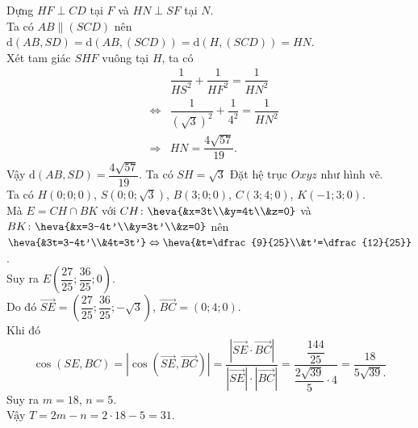 \begin{ex}
{\begin{itemchoice}
			\itemch
			Dựng $HF\perp CD$ tại $F$ và $HN\perp SF$ tại $N$.\\
			Ta có $AB\parallel (SCD)$ nên $\mathrm{d}(AB,SD)=\mathrm{d}\left(AB,\left(SCD\right)\right)=\mathrm{d}\left(H,\left(SCD\right)\right)=HN$.\\
			Xét tam giác $SHF$ vuông tại $H$, ta có 
			\begin{eqnarray*}
				&&\dfrac{1}{HS^{2}}+\dfrac{1}{HF^{2}}=\dfrac{1}{HN^{2}}\\
				&\Leftrightarrow& \dfrac{1}{(\sqrt{3})^{2}}+\dfrac{1}{4^{2}}=\dfrac{1}{HN^{2}}\\
				&\Rightarrow& HN=\dfrac{4\sqrt{57}}{19}.
			\end{eqnarray*}
			Vậy $\mathrm{d}(AB,SD)=\dfrac{4\sqrt{57}}{19}$.
			\itemch
			Ta có $SH=\sqrt{3}$
			\itemch
			Đặt hệ trục $Oxyz$ như hình vẽ.\\
			Ta có
			$H(0;0;0)$, $S\left(0;0;\sqrt{3}\right)$, $B(3;0;0)$, $C(3;4;0)$, $K(-1;3;0)$.\\
			Mà $E=CH\cap BK$ với $CH\colon \heva{&x=3t\\&y=4t\\&z=0}$ và $BK\colon \heva{&x=3-4t'\\&y=3t'\\&z=0}$ 
			nên $\heva{&3t=3-4t'\\&4t=3t'}\Leftrightarrow\heva{&t=\dfrac{9}{25}\\&t'=\dfrac{12}{25}}$.\\			
			Suy ra
			$E\left(\dfrac{27}{25};\dfrac{36}{25};0\right)$.\\
			Do đó
			$\overrightarrow{SE}=\left(\dfrac{27}{25};\dfrac{36}{25};-\sqrt{3}\right)$, $\overrightarrow{BC}=(0;4;0)$.\\
			Khi đó
			$$\cos (SE,BC)=\left|\cos \left(\overrightarrow{SE},\overrightarrow{BC}\right)\right|=\dfrac{\left|\overrightarrow{SE}\cdot \overrightarrow{BC}\right|}{\left|\overrightarrow{SE}\right|\cdot \left|\overrightarrow{BC}\right|}=\dfrac{\dfrac{144}{25}}{\dfrac{2\sqrt{39}}{5}\cdot 4}=\dfrac{18}{5\sqrt{39}.}$$
			Suy ra $m=18$, $n=5$.\\
			Vậy $T=2m-n=2\cdot 18-5=31$.
		\end{itemchoice}
	}
\end{ex}
